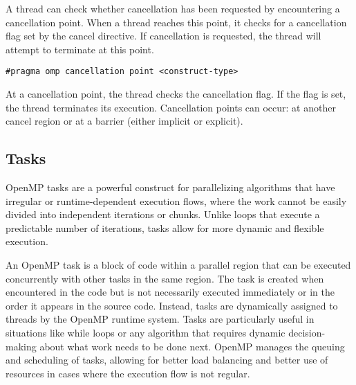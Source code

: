 A thread can check whether cancellation has been requested by encountering a cancellation point.
When a thread reaches this point, it checks for a cancellation flag set by the cancel directive. 
If cancellation is requested, the thread will attempt to terminate at this point.
\begin{lstlisting}[style=C]
#pragma omp cancellation point <construct-type>
\end{lstlisting}
At a cancellation point, the thread checks the cancellation flag. 
If the flag is set, the thread terminates its execution. 
Cancellation points can occur: at another cancel region or at a barrier (either implicit or explicit).

\subsection{Tasks}
OpenMP tasks are a powerful construct for parallelizing algorithms that have irregular or runtime-dependent execution flows, where the work cannot be easily divided into independent iterations or chunks. 
Unlike loops that execute a predictable number of iterations, tasks allow for more dynamic and flexible execution.

An OpenMP task is a block of code within a parallel region that can be executed concurrently with other tasks in the same region. 
The task is created when encountered in the code but is not necessarily executed immediately or in the order it appears in the source code. 
Instead, tasks are dynamically assigned to threads by the OpenMP runtime system.
Tasks are particularly useful in situations like while loops or any algorithm that requires dynamic decision-making about what work needs to be done next. 
OpenMP manages the queuing and scheduling of tasks, allowing for better load balancing and better use of resources in cases where the execution flow is not regular.

